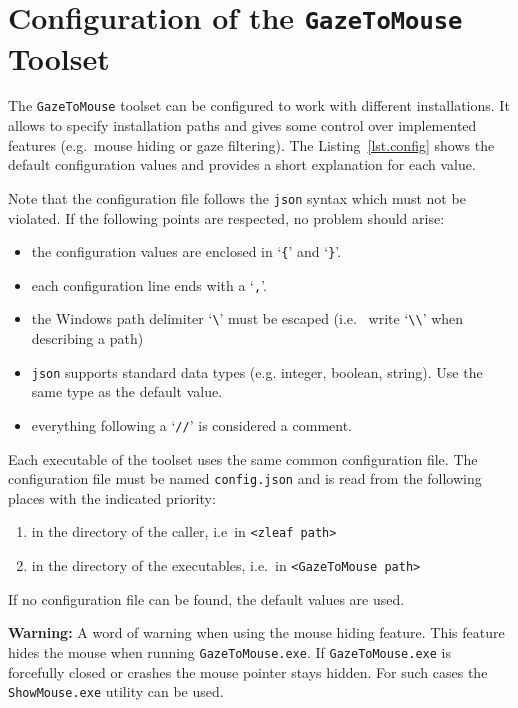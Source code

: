 \documentclass[a4paper,oneside]{book}
\begin{document}
\chapter{Configuration of the \texttt{GazeToMouse} Toolset}
\label{sec.config}
The \texttt{GazeToMouse} toolset can be configured to work with different installations.
It allows to specify installation paths and gives some control over implemented features (e.g.~mouse hiding or gaze filtering).
The Listing~\ref{lst.config} shows the default configuration values and provides a short explanation for each value.



Note that the configuration file follows the \texttt{json} syntax which must not be violated.
If the following points are respected, no problem should arise:
\begin{itemize}
    \item the configuration values are enclosed in `\texttt{\{}' and `\texttt{\}}'.
    \item each configuration line ends with a `\texttt{,}'.
    \item the Windows path delimiter `\texttt{\textbackslash}' must be escaped (i.e.~ write `\texttt{\textbackslash\textbackslash}' when describing a path)
    \item \texttt{json} supports standard data types (e.g. integer, boolean, string).
        Use the same type as the default value.
    \item everything following a `\texttt{//}' is considered a comment.
\end{itemize}

Each executable of the toolset uses the same common configuration file.
The configuration file must be named \texttt{config.json} and is read from the following places with the indicated priority:
\begin{enumerate}
    \item in the directory of the caller, i.e~in \texttt{<zleaf path>}
    \item in the directory of the executables, i.e.~in \texttt{<GazeToMouse path>}
\end{enumerate}
If no configuration file can be found, the default values are used.

\begin{mdframed}[backgroundcolor=boxbkg]\textbf{\color{red}Warning:}
    A word of warning when using the mouse hiding feature.
    This feature hides the mouse when running \texttt{GazeToMouse.exe}.
    If \texttt{GazeToMouse.exe} is forcefully closed or crashes the mouse pointer stays hidden.
    For such cases the \texttt{ShowMouse.exe} utility can be used.
\end{mdframed}
\end{document}
